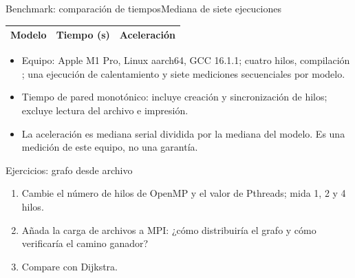 \documentclass[handout,aspectratio=169,10pt]{beamer}
\newcommand{\code}[1]{\texttt{\detokenize{#1}}}
\begin{document}
\begin{frame}{Benchmark: comparación de tiempos}{Mediana de siete ejecuciones}
	\begin{center}\begin{tabular}{lrr}\toprule
			Modelo & Tiempo (s) & Aceleración \\\midrule
			
	\end{tabular}\end{center}
	\begin{itemize}[<+->]
		\item Equipo: Apple M1 Pro, Linux aarch64, GCC 16.1.1; cuatro hilos, compilación \code{-O2}; una ejecución de calentamiento y siete mediciones secuenciales por modelo.
		\item Tiempo de pared monotónico: incluye creación y sincronización de hilos; excluye lectura del archivo e impresión.
		\item La aceleración es mediana serial dividida por la mediana del modelo. Es una medición de este equipo, no una garantía.
	\end{itemize}
\end{frame}


\begin{frame}{Ejercicios: grafo desde archivo}
\begin{enumerate}[<+->]
\item Cambie el número de hilos de OpenMP y el valor \code{THREADS} de Pthreads; mida 1, 2 y 4 hilos.
\item Añada la carga de archivos a MPI: ¿cómo distribuiría el grafo y cómo verificaría el camino ganador?
\item Compare con Dijkstra.
\end{enumerate}
\end{frame}
\end{document}
